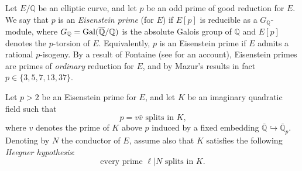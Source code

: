 \documentclass[10pt]{amsart}
\numberwithin{equation}{section}
\theoremstyle{definition}
\theoremstyle{remark}
\newcommand{\bQ}{\mathbb{Q}}
\newcommand{\Q}{\mathbb{Q}}
\begin{document}
Let $E/\Q$ be an elliptic curve, and let $p$ be an odd prime of good reduction for $E$. We say that $p$ is an \emph{Eisenstein prime} (for $E$) if $E[p]$ is reducible as a $G_\Q$-module, where $G_\Q={\rm Gal}(\overline{\Q}/\Q)$ is the absolute Galois group of $\Q$ and $E[p]$ denotes the $p$-torsion of $E$. Equivalently, $p$ is an Eisenstein prime if $E$ admits a rational $p$-isogeny. By a result of Fontaine (see \cite{edixhoven-weight} for an account), Eisenstein primes are primes of \emph{ordinary} reduction for $E$, and by Mazur's results \cite{mazur} in fact $p\in\{3, 5, 7, 13, 37\}$. 


Let $p>2$ be an Eisenstein prime for $E$, and let $K$ be an imaginary quadratic field such that 
\begin{equation}\label{eq:intro-spl}
\textrm{$p=v\bar{v}$ splits in $K$,}\tag{spl} 
\end{equation} 
where $v$ denotes the prime of $K$ above $p$ induced by a fixed embedding $\overline{\bQ}\hookrightarrow\overline{\bQ}_p$. 
Denoting by $N$ the conductor of $E$, assume also that $K$ satisfies the following \emph{Heegner hypothesis}:
\begin{equation}\label{eq:intro-Heeg}
\textrm{every prime $\ell\vert N$ splits in $K$.}\tag{Heeg}
\end{equation}
\end{document}

